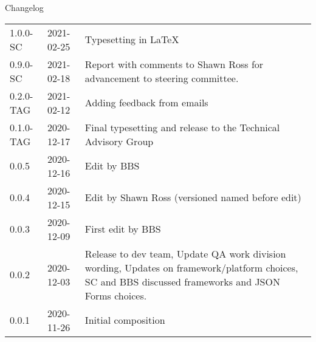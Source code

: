 \documentclass{faims3_report}
\begin{document}

\maketitle %

\newpage


\textcolor{faimsblue}{Changelog}

\begin{tabular}{@{}l l p{}}
	1.0.0-SC & 2021-02-25 & Typesetting in \LaTeX{}\\
	0.9.0-SC & 2021-02-18 & Report with comments to Shawn Ross for  advancement to steering committee. \\
	0.2.0-TAG & 2021-02-12 & Adding feedback from emails \\
	0.1.0-TAG & 2020-12-17 & Final typesetting and release to the Technical Advisory Group \\
	0.0.5 & 2020-12-16 & Edit by BBS \\
	0.0.4 & 2020-12-15 & Edit by Shawn Ross (versioned named before edit) \\
	0.0.3 & 2020-12-09 & First edit by BBS \\
	0.0.2 & 2020-12-03 & Release to dev team, Update QA work division wording, Updates on framework/platform choices, SC and BBS discussed frameworks and JSON Forms choices. \\
	0.0.1 & 2020-11-26 & Initial composition \\
\end{tabular}
\vfill
\copyrightnotice %

\newpage


\outputtoc %

\end{document}
